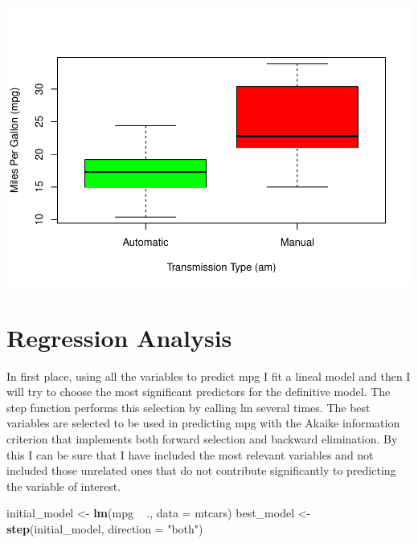 \documentclass[]{article}
\newenvironment{Shaded}{\begin{snugshade}}{\end{snugshade}}
\newcommand{\KeywordTok}[1]{\textcolor[rgb]{0.13,0.29,0.53}{\textbf{{#1}}}}
\newcommand{\DataTypeTok}[1]{\textcolor[rgb]{0.13,0.29,0.53}{{#1}}}
\newcommand{\StringTok}[1]{\textcolor[rgb]{0.31,0.60,0.02}{{#1}}}
\newcommand{\NormalTok}[1]{{#1}}
\begin{document}
\includegraphics{regression_models_report_files/figure-latex/unnamed-chunk-3-1.pdf}

\section{Regression Analysis}\label{regression-analysis}

In first place, using all the variables to predict mpg I fit a lineal
model and then I will try to choose the most significant predictors for
the definitive model. The step function performs this selection by
calling lm several times. The best variables are selected to be used in
predicting mpg with the Akaike information criterion that implements
both forward selection and backward elimination. By this I can be sure
that I have included the most relevant variables and not included those
unrelated ones that do not contribute significantly to predicting the
variable of interest.

\begin{Shaded}
\begin{Highlighting}[]
\NormalTok{initial_model <-}\StringTok{ }\KeywordTok{lm}\NormalTok{(mpg ~}\StringTok{ }\NormalTok{., }\DataTypeTok{data =} \NormalTok{mtcars)}
\NormalTok{best_model <-}\StringTok{ }\KeywordTok{step}\NormalTok{(initial_model, }\DataTypeTok{direction =} \StringTok{"both"}\NormalTok{)}
\end{Highlighting}
\end{Shaded}
\end{document}
